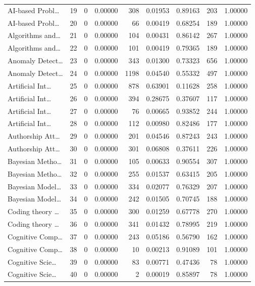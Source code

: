 \begin{table}
\begin{tabular}{lrrrrrrrr}
AI-based Probl… & 19 & 0 & 0.00000 & 308 & 0.01953 & 0.89163 & 203 & 1.00000 \\
AI-based Probl… & 20 & 0 & 0.00000 & 66 & 0.00419 & 0.68254 & 189 & 1.00000 \\
Algorithms and… & 21 & 0 & 0.00000 & 104 & 0.00431 & 0.86142 & 267 & 1.00000 \\
Algorithms and… & 22 & 0 & 0.00000 & 101 & 0.00419 & 0.79365 & 189 & 1.00000 \\
Anomaly Detect… & 23 & 0 & 0.00000 & 343 & 0.01300 & 0.73323 & 656 & 1.00000 \\
Anomaly Detect… & 24 & 0 & 0.00000 & 1198 & 0.04540 & 0.55332 & 497 & 1.00000 \\
Artificial Int… & 25 & 0 & 0.00000 & 878 & 0.63901 & 0.11628 & 258 & 1.00000 \\
Artificial Int… & 26 & 0 & 0.00000 & 394 & 0.28675 & 0.37607 & 117 & 1.00000 \\
Artificial Int… & 27 & 0 & 0.00000 & 76 & 0.00665 & 0.93852 & 244 & 1.00000 \\
Artificial Int… & 28 & 0 & 0.00000 & 112 & 0.00980 & 0.82486 & 177 & 1.00000 \\
Authorship Att… & 29 & 0 & 0.00000 & 201 & 0.04546 & 0.87243 & 243 & 1.00000 \\
Authorship Att… & 30 & 0 & 0.00000 & 301 & 0.06808 & 0.37611 & 226 & 1.00000 \\
Bayesian Metho… & 31 & 0 & 0.00000 & 105 & 0.00633 & 0.90554 & 307 & 1.00000 \\
Bayesian Metho… & 32 & 0 & 0.00000 & 255 & 0.01537 & 0.63415 & 205 & 1.00000 \\
Bayesian Model… & 33 & 0 & 0.00000 & 334 & 0.02077 & 0.76329 & 207 & 1.00000 \\
Bayesian Model… & 34 & 0 & 0.00000 & 242 & 0.01505 & 0.70745 & 188 & 1.00000 \\
Coding theory … & 35 & 0 & 0.00000 & 300 & 0.01259 & 0.67778 & 270 & 1.00000 \\
Coding theory … & 36 & 0 & 0.00000 & 341 & 0.01432 & 0.78995 & 219 & 1.00000 \\
Cognitive Comp… & 37 & 0 & 0.00000 & 243 & 0.05186 & 0.56790 & 162 & 1.00000 \\
Cognitive Comp… & 38 & 0 & 0.00000 & 10 & 0.00213 & 0.91089 & 101 & 1.00000 \\
Cognitive Scie… & 39 & 0 & 0.00000 & 83 & 0.00771 & 0.47436 & 78 & 1.00000 \\
Cognitive Scie… & 40 & 0 & 0.00000 & 2 & 0.00019 & 0.85897 & 78 & 1.00000 \\

\end{tabular}
\end{table}
